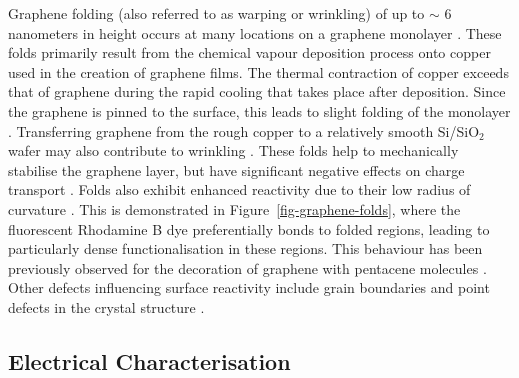 \documentclass[
  a4paper,
]{scrbook}
\begin{document}
Graphene folding (also referred to as warping or wrinkling) of up to
\(\sim\) 6 nanometers in height occurs at many locations on a graphene
monolayer \autocite{Zhu2012}. These folds primarily result from the
chemical vapour deposition process onto copper used in the creation of
graphene films. The thermal contraction of copper exceeds that of
graphene during the rapid cooling that takes place after deposition.
Since the graphene is pinned to the surface, this leads to slight
folding of the monolayer \autocite{Zhao2012,Zhu2012,Chhikara2013}.
Transferring graphene from the rough copper to a relatively smooth
Si/SiO\(_2\) wafer may also contribute to wrinkling
\autocite{Zhao2012,Kireev2017}. These folds help to mechanically
stabilise the graphene layer, but have significant negative effects on
charge transport \autocite{Geim2007,Chhikara2013,Zhu2012}. Folds also
exhibit enhanced reactivity due to their low radius of curvature
\autocite{Zhao2012}. This is demonstrated in
Figure~\ref{fig-graphene-folds}, where the fluorescent Rhodamine B dye
preferentially bonds to folded regions, leading to particularly dense
functionalisation in these regions. This behaviour has been previously
observed for the decoration of graphene with pentacene molecules
\autocite{Chhikara2013}. Other defects influencing surface reactivity
include grain boundaries and point defects in the crystal structure
\autocite{Zhao2012,Chhikara2013,Kireev2017}.

\hypertarget{sec-electrical-characterisation-graphene}{%
\subsection{Electrical
Characterisation}\label{sec-electrical-characterisation-graphene}}
\end{document}
